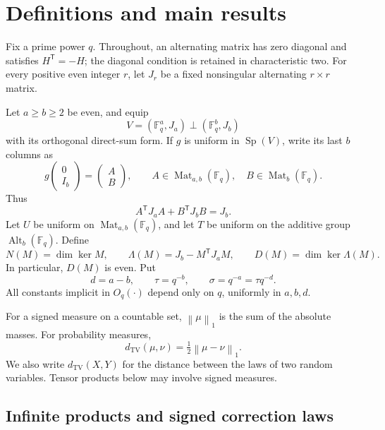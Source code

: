 \documentclass[11pt]{article}
\theoremstyle{definition}
\theoremstyle{remark}
\newcommand{\F}{\mathbb F}
\newcommand{\TV}{d_{\mathrm{TV}}}
\newcommand{\Mat}{\operatorname{Mat}}
\newcommand{\Alt}{\operatorname{Alt}}
\newcommand{\Sp}{\operatorname{Sp}}
\newcommand{\normone}[1]{\left\|#1\right\|_1}
\newcommand{\tr}{\mathsf T}
\begin{document}
\section{Definitions and main results}\label{sec:main}

Fix a prime power $q$. Throughout, an alternating matrix has zero diagonal and satisfies $H^{\tr}=-H$; the diagonal condition is retained in characteristic two. For every positive even integer $r$, let $J_r$ be a fixed nonsingular alternating $r\times r$ matrix.

Let $a\ge b\ge2$ be even, and equip
\[
 V=(\F_q^a,J_a)\perp(\F_q^b,J_b)
\]
with its orthogonal direct-sum form. If $g$ is uniform in $\Sp(V)$, write its last $b$ columns as
\begin{equation}\label{eq:model}
 g\begin{pmatrix}0\\I_b\end{pmatrix}
 =\begin{pmatrix}A\\B\end{pmatrix},
 \qquad A\in\Mat_{a,b}(\F_q),\quad B\in\Mat_b(\F_q).
\end{equation}
Thus
\begin{equation}\label{eq:gram-condition}
 A^{\tr}J_aA+B^{\tr}J_bB=J_b.
\end{equation}
Let $U$ be uniform on $\Mat_{a,b}(\F_q)$, and let $T$ be uniform on the additive group $\Alt_b(\F_q)$. Define
\[
 N(M)=\dim\ker M,\qquad
 \Lambda(M)=J_b-M^{\tr}J_aM,\qquad D(M)=\dim\ker\Lambda(M).
\]
In particular, $D(M)$ is even. Put
\begin{equation}\label{eq:parameters}
 d=a-b,\qquad \tau=q^{-b},\qquad \sigma=q^{-a}=\tau q^{-d}.
\end{equation}
All constants implicit in $O_q(\cdot)$ depend only on $q$, uniformly in $a,b,d$.

For a signed measure on a countable set, $\normone{\mu}$ is the sum of the absolute masses. For probability measures,
\[
 \TV(\mu,\nu)=\tfrac12\normone{\mu-\nu}.
\]
We also write $\TV(X,Y)$ for the distance between the laws of two random variables. Tensor products below may involve signed measures.

\subsection{Infinite products and signed correction laws}
\end{document}
